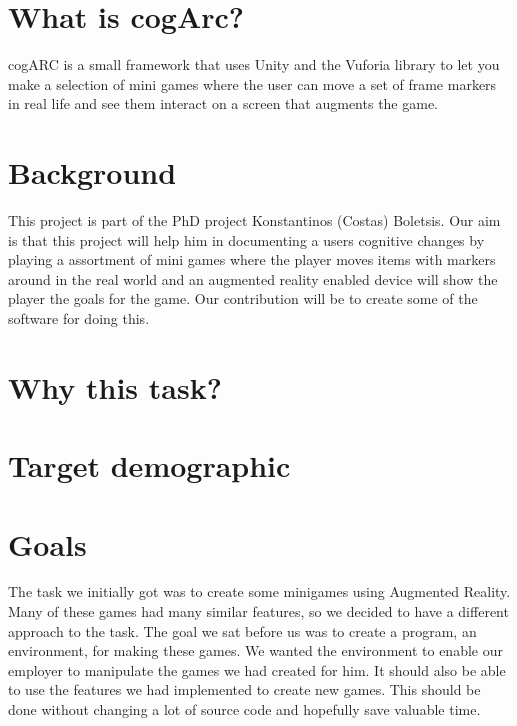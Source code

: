 \section{What is cogArc?}
cogARC is a small framework that uses Unity and the Vuforia library to let you make a selection of mini games where the user can move a set of frame markers in real life and see them interact on a screen that augments the game.

\section{Background}
This project is part of the PhD project Konstantinos (Costas) Boletsis. Our aim is that this project will help him in documenting a users cognitive changes by playing a assortment of mini games where the player moves items with markers around in the real world and an augmented reality enabled device will show the player the goals for the game. Our contribution will be to create some of the software for doing this.

\section{Why this task?}

\section{Target demographic}

\section{Goals}
The task we initially got was to create some minigames using \gls{Augmented Reality}. Many of these games had many similar features, so we decided to have a different approach to the task. The goal we sat before us was to create a program, an environment, for making these games. We wanted the environment to enable our employer to manipulate the games we had created for him. It should also be able to use the features we had implemented to create new games. This should be done without changing a lot of source code and hopefully save valuable time.




